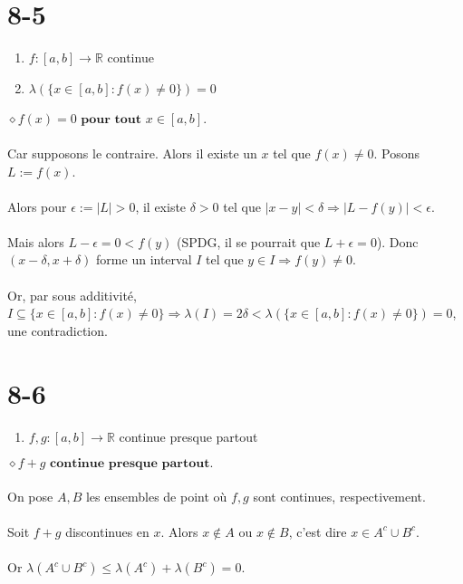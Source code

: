 \documentclass[a4paper,10pt]{article}
\begin{document}
\section*{8-5}
\begin{enumerate}
 \item $f : [a,b] \rightarrow \mathbb{R}$ continue
 \item $\lambda \left ( \{ x \in [a,b] : f(x) \not = 0\} \right) = 0$
\end{enumerate}
$\diamond f(x) = 0 \textbf{ pour tout } x \in [a,b]$.
\\
\\
Car supposons le contraire. Alors il existe un $x$ tel que $f(x) \not= 0$. Posons $L := f(x)$.
\\
\\
Alors pour $\epsilon := |L| > 0$, il existe $\delta > 0$ tel que $|x - y| < \delta \Rightarrow |L - f(y)| < \epsilon $.
\\
\\
Mais alors $L - \epsilon = 0 < f(y)$ (SPDG, il se pourrait que $L + \epsilon = 0$). 
Donc $(x - \delta, x + \delta)$ forme un interval $I$ tel que $y \in I \Rightarrow f(y) \not = 0$.
\\
\\
Or, par sous additivité, $I \subseteq \{ x \in [a,b] : f(x) \not = 0\} \Rightarrow  \lambda (I) = 2\delta < 
\lambda \left ( \{ x \in [a,b] : f(x) \not = 0\} \right) = 0 $, une contradiction.
\section*{8-6}
\begin{enumerate}
 \item $f,g : [a,b] \rightarrow \mathbb{R}$ continue presque partout
\end{enumerate}
$\diamond f + g \textbf{ continue presque partout.}$
\\
\\
On pose $A, B$ les ensembles de point où $f, g$ sont continues, respectivement.
\\
\\
Soit $f+g$ discontinues en $x$. Alors $x \not \in A$ ou $x \not \in B$, c'est dire $x \in A^c \cup B^c$. 
\\
\\
Or $\lambda(A^c \cup B^c) \leq \lambda(A^c) + \lambda(B^c) = 0$.
\end{document}
